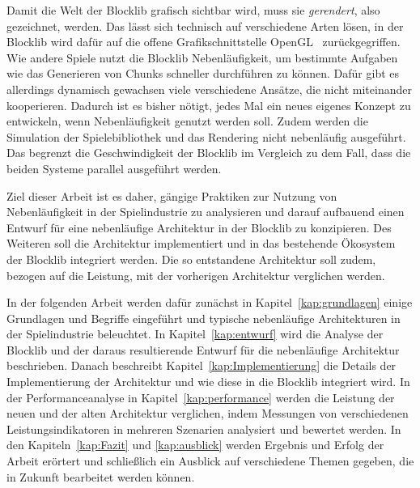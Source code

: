 Damit die Welt der Blocklib grafisch sichtbar wird, muss sie \emph{gerendert}, also gezeichnet, werden. Das lässt sich technisch auf verschiedene Arten lösen, in der Blocklib wird dafür auf die offene Grafikschnittstelle OpenGL~\cite{TheKhronosGroup,Vries2020} zurückgegriffen. Wie andere Spiele nutzt die Blocklib Nebenläufigkeit, um bestimmte Aufgaben wie das Generieren von Chunks schneller durchführen zu können. Dafür gibt es allerdings dynamisch gewachsen viele verschiedene Ansätze, die nicht miteinander kooperieren. Dadurch ist es bisher nötigt, jedes Mal ein neues eigenes Konzept zu entwickeln, wenn Nebenläufigkeit genutzt werden soll. Zudem werden die Simulation der Spielebibliothek und das Rendering nicht nebenläufig ausgeführt. Das begrenzt die Geschwindigkeit der Blocklib im Vergleich zu dem Fall, dass die beiden Systeme parallel ausgeführt werden.

Ziel dieser Arbeit ist es daher, gängige Praktiken zur Nutzung von Nebenläufigkeit in der Spielindustrie zu analysieren und darauf aufbauend einen Entwurf für eine nebenläufige Architektur in der Blocklib zu konzipieren. Des Weiteren soll die Architektur implementiert und in das bestehende Ökosystem der Blocklib integriert werden. Die so entstandene Architektur soll zudem, bezogen auf die Leistung, mit der vorherigen Architektur verglichen werden.

In der folgenden Arbeit werden dafür zunächst in Kapitel~\ref{kap:grundlagen} einige Grundlagen und Begriffe eingeführt und typische nebenläufige Architekturen in der Spielindustrie beleuchtet. In Kapitel~\ref{kap:entwurf} wird die Analyse der Blocklib und der daraus resultierende Entwurf für die nebenläufige Architektur beschrieben. Danach beschreibt Kapitel~\ref{kap:Implementierung} die Details der Implementierung der Architektur und wie diese in die Blocklib integriert wird. In der Performanceanalyse in Kapitel~\ref{kap:performance} werden die Leistung der neuen und der alten Architektur verglichen, indem Messungen von verschiedenen Leistungsindikatoren in mehreren Szenarien analysiert und bewertet werden. In den Kapiteln~\ref{kap:Fazit} und \ref{kap:ausblick} werden Ergebnis und Erfolg der Arbeit erörtert und schließlich ein Ausblick auf verschiedene Themen gegeben, die in Zukunft bearbeitet werden können.